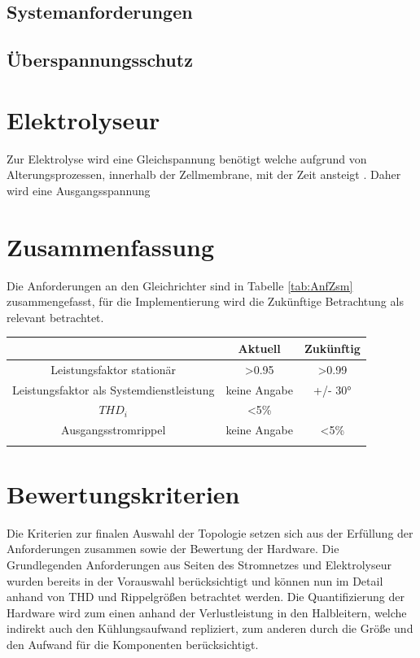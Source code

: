 \subsection{Systemanforderungen}


\subsection{Überspannungsschutz}

\section{Elektrolyseur}
Zur Elektrolyse wird eine Gleichspannung benötigt welche aufgrund von Alterungsprozessen, innerhalb der Zellmembrane, mit der Zeit ansteigt \cite{HydrogenElectronicTopologies}. Daher wird eine Ausgangsspannung 
\section{Zusammenfassung}
Die Anforderungen an den Gleichrichter sind in Tabelle \ref{tab:AnfZsm} zusammengefasst, für die Implementierung wird die Zukünftige Betrachtung als relevant betrachtet.
\begin{tabular}{c|c|c}

	& Aktuell & Zukünftig \\
	\hline
	Leistungsfaktor stationär & >0.95 & >0.99 \\
		\hline
	Leistungsfaktor als Systemdienstleistung & keine Angabe & +/- 30° \\
	\hline
	$THD_i$ & <5\% &  \\
	\hline
	Ausgangsstromrippel & keine Angabe & <5\% \\
	
	
	\label{tab:AnfZsm}
\end{tabular}
\section{Bewertungskriterien}
Die Kriterien zur finalen Auswahl der Topologie setzen sich aus der Erfüllung der Anforderungen zusammen sowie der Bewertung der Hardware. Die Grundlegenden Anforderungen aus Seiten des Stromnetzes und Elektrolyseur wurden bereits in der Vorauswahl berücksichtigt und können nun im Detail anhand von \gls{THD} und Rippelgrößen betrachtet werden. Die Quantifizierung der Hardware wird zum einen anhand der Verlustleistung in den Halbleitern, welche indirekt auch den Kühlungsaufwand repliziert, zum anderen durch die Größe und den Aufwand für die Komponenten berücksichtigt.  